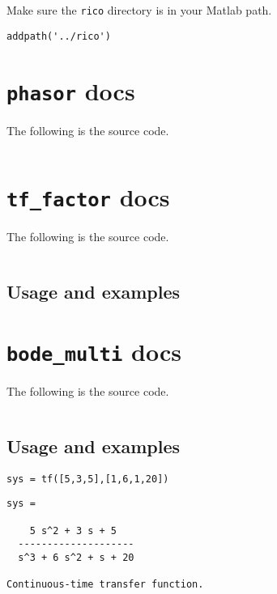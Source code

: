 Make sure the \texttt{rico} directory is in your Matlab
path.

\begin{verbatim}
addpath('../rico')
\end{verbatim}

\hypertarget{phasor-docs}{%
\section{\texorpdfstring{\texttt{phasor}
docs}{ docs}}\label{phasor-docs}}

The following is the source code.

\inputminted{matlab}{../rico/phasor.m}

\hypertarget{tf_factor-docs}{%
\section{\texorpdfstring{\texttt{tf_factor}
docs}{ docs}}\label{tf_factor-docs}}

The following is the source code.

\inputminted{matlab}{../rico/tf_factor.m}

\hypertarget{usage-and-examples}{%
\subsection{Usage and examples}\label{usage-and-examples}}

\hypertarget{bode_multi-docs}{%
\section{\texorpdfstring{\texttt{bode_multi}
docs}{ docs}}\label{bode_multi-docs}}

The following is the source code.

\inputminted{matlab}{../rico/bode_multi.m}

\hypertarget{usage-and-examples-1}{%
\subsection{Usage and examples}\label{usage-and-examples-1}}

\begin{verbatim}
sys = tf([5,3,5],[1,6,1,20])
\end{verbatim}

\begin{verbatim}
sys =
 
    5 s^2 + 3 s + 5
  --------------------
  s^3 + 6 s^2 + s + 20
 
Continuous-time transfer function.
\end{verbatim}

